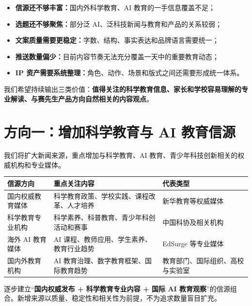 \documentclass[UTF8,11pt,a4paper,fontset=none]{ctexart}
\begin{document}
\begin{factbox}[这次升级主要解决什么问题]
\begin{itemize}
  \item \textbf{信源还不够丰富：}国内外科学教育、AI 教育的一手信息覆盖不足；
  \item \textbf{选题还不够聚焦：}部分泛 AI、泛科技新闻与教育和产品的关系较弱；
  \item \textbf{文案质量需要更稳定：}字数、结构、事实表达和品牌语言需要统一；
  \item \textbf{推送数量偏少：}目前内容节奏无法充分覆盖一天中的重要教育动态；
  \item \textbf{IP 资产需要系统整理：}角色、动作、场景和版式之间还需要形成统一体系。
\end{itemize}
\end{factbox}

\begin{summarybox}[升级后的内容定位]
我们希望持续输出三类价值：\textbf{值得关注的科学教育信息、家长和学校容易理解的专业解读、与赛先生产品方向自然相关的内容观点}。
\end{summarybox}

\section{方向一：增加科学教育与 AI 教育信源}

我们将扩大新闻来源，重点增加与科学教育、AI 教育、青少年科技创新相关的权威机构和专业媒体。

\begin{tabularx}{\textwidth}{@{}L{38mm} Y Y@{}}
\toprule
\textbf{信源方向} & \textbf{重点关注内容} & \textbf{代表类型} \\
\midrule
国内权威教育媒体 & 科学教育政策、学校实践、课程改革、人才培养 & 新华教育等权威媒体 \\
科学教育专业机构 & 科学素养、科普教育、青少年科创活动和赛事 & 中国科协及相关机构 \\
海外 AI 教育媒体 & AI 课程、教师应用、学生素养、教育行业趋势 & EdSurge 等专业媒体 \\
国内外教育机构 & AI 教育治理、数字教育框架、国际教育趋势 & 教育部门、国际组织、高校与实验室 \\
\bottomrule
\end{tabularx}

\begin{decisionbox}[我们的方向]
逐步建立“\textbf{国内权威发布 + 科学教育专业内容 + 国际 AI 教育观察}”的信源组合。新增来源以质量、稳定性和相关性为前提，不为追求数量盲目扩充。
\end{decisionbox}
\end{document}
